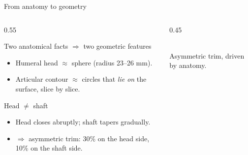 \begin{frame}{From anatomy to geometry}
  \begin{columns}[T]
    \begin{column}{0.55\textwidth}
      \begin{block}{Two anatomical facts $\Rightarrow$ two geometric features}
        \begin{itemize}
          \item Humeral head $\approx$ \alert{sphere} (radius 23--26 mm).
          \item Articular contour $\approx$ \alert{circles} that \emph{lie on} the surface, slice by slice.
        \end{itemize}
      \end{block}
      \begin{block}{Head $\neq$ shaft}
        \begin{itemize}
          \item Head closes \alert{abruptly}; shaft tapers \alert{gradually}.
          \item $\Rightarrow$ asymmetric trim: \alert{30\%} on the head side, \alert{10\%} on the shaft side.
        \end{itemize}
      \end{block}
    \end{column}
    \begin{column}{0.45\textwidth}
      \centering
      \\[0.3em]
      {\scriptsize Asymmetric trim, driven by anatomy.}
    \end{column}
  \end{columns}
\end{frame}
